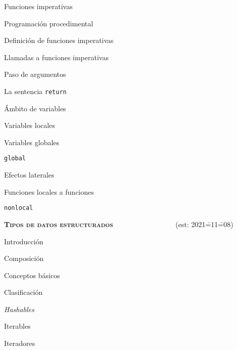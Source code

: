 \begin{longenum}
\begin{longenum}
        \item Funciones imperativas
        \begin{longenum}
            \item Programación procedimental
            \item Definición de funciones imperativas
            \item Llamadas a funciones imperativas
            \item Paso de argumentos
            \item La sentencia \texttt{return}
            \item Ámbito de variables
            \begin{longenum}
                \item Variables locales
                \item Variables globales
                \begin{longenum}
                    \item \texttt{global}
                    \item Efectos laterales
                \end{longenum}
            \end{longenum}
            \item Funciones locales a funciones
            \begin{longenum}
                \item \texttt{nonlocal}
            \end{longenum}
        \end{longenum}
    \end{longenum}
    \item \textbf{\textsc{Tipos de datos estructurados}} \ \ \ \ \ \ \ \ \ \ \ \ \ \ \ \ \ (est: 2021\==11\==08)
    \begin{longenum}
        \item Introducción
        \begin{longenum}
            \item Composición
            \item Conceptos básicos
            \item Clasificación
            \item \textit{Hashables}
            \item Iterables
            \item Iteradores
            \begin{longenum}

\end{longenum}
\end{longenum}
\end{longenum}
\end{longenum}
